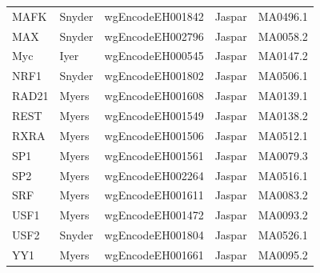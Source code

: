 \documentclass{bioinfo}
\begin{document}
\begin{table}[t]
\begin{center}
\begin{tabular}{ l|ll|ll }
        MAFK    & Snyder & wgEncodeEH001842 & Jaspar     & MA0496.1 \\
        MAX     & Snyder & wgEncodeEH002796 & Jaspar     & MA0058.2 \\
        Myc     & Iyer   & wgEncodeEH000545 & Jaspar     & MA0147.2 \\
        NRF1    & Snyder & wgEncodeEH001802 & Jaspar     & MA0506.1 \\
        RAD21   & Myers  & wgEncodeEH001608 & Jaspar     & MA0139.1 \\
        REST    & Myers  & wgEncodeEH001549 & Jaspar     & MA0138.2 \\
        RXRA    & Myers  & wgEncodeEH001506 & Jaspar     & MA0512.1 \\
        SP1     & Myers  & wgEncodeEH001561 & Jaspar     & MA0079.3 \\
        SP2     & Myers  & wgEncodeEH002264 & Jaspar     & MA0516.1 \\
        SRF     & Myers  & wgEncodeEH001611 & Jaspar     & MA0083.2 \\
        USF1    & Myers  & wgEncodeEH001472 & Jaspar     & MA0093.2 \\
        USF2    & Snyder & wgEncodeEH001804 & Jaspar     & MA0526.1 \\
        YY1     & Myers  & wgEncodeEH001661 & Jaspar     & MA0095.2 \\
        \hline
    \end{tabular}
\end{center}
\end{table}
\end{document}
